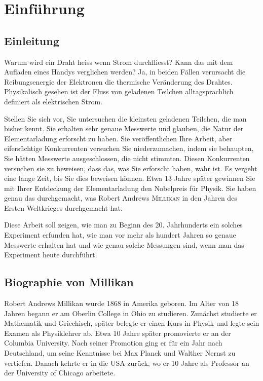 \chapter{Einführung}\label{ch:einfuerung}
\section{Einleitung}\label{sec:einleitung}
Warum wird ein Draht heiss wenn Strom durchfliesst? Kann das mit dem Aufladen eines Handys verglichen werden? Ja, in beiden Fällen verursacht die Reibungsenergie der Elektronen die thermische Veränderung des Drahtes. Physikalisch gesehen ist der Fluss von geladenen Teilchen alltagsprachlich definiert als elektrischen Strom.
  
Stellen Sie sich vor, Sie untersuchen die kleinsten geladenen Teilchen, die man bisher kennt. Sie erhalten sehr genaue Messwerte und glauben, die Natur der Elementarladung erforscht zu haben. Sie veröffentlichen Ihre Arbeit, aber eifersüchtige Konkurrenten versuchen Sie niederzumachen, indem sie behaupten, Sie hätten Messwerte ausgeschlossen, die nicht stimmten.  Diesen Konkurrenten versuchen sie zu beweisen, dass das, was Sie erforscht haben, wahr ist. Es vergeht eine lange Zeit, bis Sie dies beweisen können. Etwa 13 Jahre später gewinnen Sie mit Ihrer Entdeckung der Elementarladung den Nobelpreis für Physik. Sie haben genau das durchgemacht, was Robert Andrews {\scshape Millikan} in den Jahren des Ersten Weltkrieges durchgemacht hat.

Diese Arbeit soll zeigen, wie man zu Beginn des 20. Jahrhunderts ein solches Experiment erfunden hat, wie man vor mehr als hundert Jahren so genaue Messwerte erhalten hat und wie genau solche Messungen sind, wenn man das Experiment heute durchführt.


\section{Biographie von Millikan}\label{sec:autobiographie}
Robert Andrews {\sc Millikan} wurde 1868 in Amerika geboren. Im Alter von 18 Jahren begann er am Oberlin College in Ohio zu studieren. Zunächst studierte er Mathematik und Griechisch, später belegte er einen Kurs in Physik und legte sein Examen als Physiklehrer ab. Etwa 10 Jahre später promovierte er an der Columbia University. Nach seiner Promotion ging er für ein Jahr nach Deutschland, um seine Kenntnisse bei Max {\sc Planck} und Walther {\sc Nernst} zu vertiefen. Danach kehrte er in die USA zurück, wo er 10 Jahre als Professor an der University of Chicago arbeitete. 

